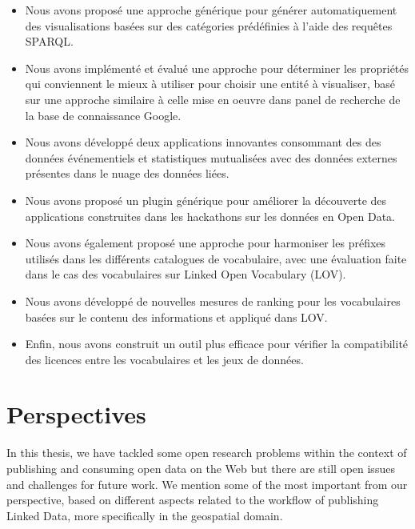 \documentclass[a4paper,11pt,twoside]{report}
\begin{document}
\begin{itemize}
\item 

Nous avons proposé une approche générique pour générer automatiquement des visualisations basées sur des catégories prédéfinies à l'aide des requêtes SPARQL.

\item 

Nous avons implémenté et évalué une approche pour déterminer les propriétés qui conviennent le mieux à utiliser pour choisir une entité à visualiser, basé sur une approche similaire à celle mise en oeuvre dans panel de recherche de la base de connaissance Google.


\item 
Nous avons développé deux applications innovantes consommant des des données événementiels et statistiques mutualisées avec des données externes présentes dans le nuage des données liées. 

\item 
Nous avons proposé un plugin générique pour améliorer la découverte des applications construites dans les hackathons sur les données en Open Data.

\item 
Nous avons également proposé une approche pour harmoniser les préfixes utilisés dans les différents catalogues de vocabulaire, avec une évaluation faite dans le cas des vocabulaires  sur Linked Open Vocabulary (LOV).

\item 
Nous avons développé de nouvelles mesures de ranking pour les vocabulaires basées sur le contenu des informations et appliqué dans LOV.

\item 
Enfin, nous avons construit un outil plus efficace pour vérifier la compatibilité des licences entre les vocabulaires et les jeux de données.

\end{itemize}


\section*{Perspectives}
\label{sec:future}

In this thesis, we have tackled some open research problems within the context of publishing and consuming open data on the Web but there are still open issues and challenges for future work. We mention some of the most important from our perspective, based on different aspects related to the workflow of publishing Linked Data, more specifically in the geospatial domain. 
\end{document}
